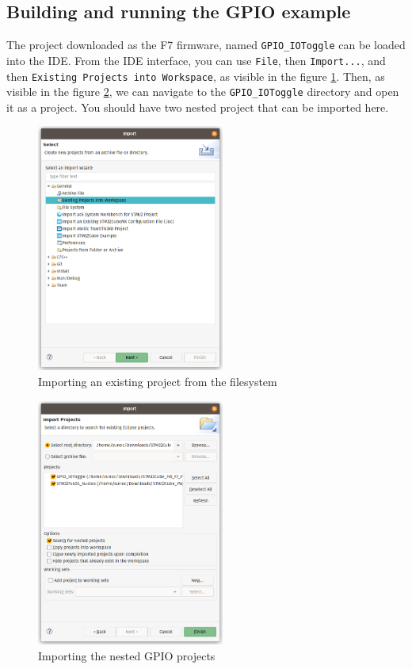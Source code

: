 \documentclass[10pt]{article}
\begin{document}
\subsection{Building and running the GPIO example}
\label{sec:build-runn-gpio}
The project downloaded as the F7 firmware, named \verb|GPIO_IOToggle| can be loaded into the IDE.
From the IDE interface, you can use \verb|File|, then \verb|Import...|, and then \verb|Existing Projects into Workspace|, as visible in the figure \ref{fig:import}. Then, as visible in the figure \ref{fig:project}, we can navigate to the \verb|GPIO_IOToggle| directory and open it as a project. You should have two nested project that can be imported here.

\begin{figure}[h]
  \centering
  \includegraphics[width=0.55\textwidth]{./img/import.png}
  \caption{Importing an existing project from the filesystem}
  \label{fig:import}
\end{figure}

\begin{figure}[h]
  \centering
  \includegraphics[width=0.55\textwidth]{./img/project.png}
  \caption{Importing the nested GPIO projects}
  \label{fig:project}
\end{figure}
\end{document}

